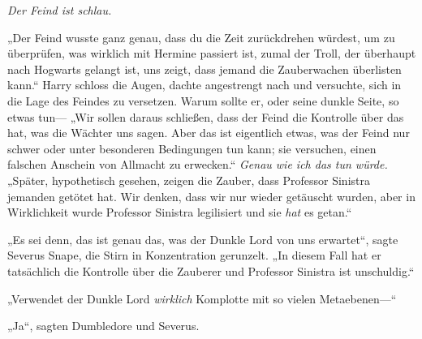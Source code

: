 \emph{Der Feind ist schlau.}

„Der Feind wusste ganz genau, dass du die Zeit zurückdrehen würdest, um zu überprüfen, was wirklich mit Hermine passiert ist, zumal der Troll, der überhaupt nach Hogwarts gelangt ist, uns zeigt, dass jemand die Zauberwachen überlisten kann.“ Harry schloss die Augen, dachte angestrengt nach und versuchte, sich in die Lage des Feindes zu versetzen.
Warum sollte er, oder seine dunkle Seite, so etwas tun—
„Wir sollen daraus schließen, dass der Feind die Kontrolle über das hat, was die Wächter uns sagen. Aber das ist eigentlich etwas, was der Feind nur schwer oder unter besonderen Bedingungen tun kann; sie versuchen, einen falschen Anschein von Allmacht zu erwecken.“
\emph{Genau wie ich das tun würde.}
„Später, hypothetisch gesehen, zeigen die Zauber, dass Professor Sinistra jemanden getötet hat. Wir denken, dass wir nur wieder getäuscht wurden, aber in Wirklichkeit wurde Professor Sinistra legilisiert und sie \emph{hat} es getan.“

„Es sei denn, das ist genau das, was der Dunkle Lord von uns erwartet“, sagte Severus Snape, die Stirn in Konzentration gerunzelt. „In diesem Fall hat er tatsächlich die Kontrolle über die Zauberer und Professor Sinistra ist unschuldig.“

„Verwendet der Dunkle Lord \emph{wirklich} Komplotte mit so vielen Metaebenen—“

„Ja“, sagten Dumbledore und Severus.

